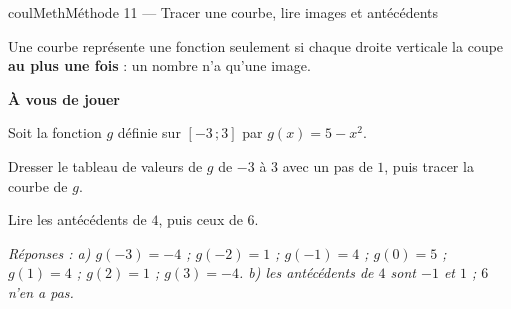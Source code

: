 \documentclass[11pt,a4paper]{article}
\makeatletter
\newcommand{\lycee@intff}[2]{\left[#1\,;#2\right]}
\providecommand{\intff}{\lycee@intff}%
\newcounter{lycee@signet}
\newcommand{\signet}[3][]{\stepcounter{lycee@signet}%
  \edef\lycee@dest{\if\relax\detokenize{#1}\relax
    signet.\arabic{lycee@signet}\else#1\fi}%
  \hypertarget{\lycee@dest}{}\bookmark[level=#2,dest=\lycee@dest]{#3}}
\newcounter{methode}
\newenvironment{methodebox}[1][Méthode]{\stepcounter{methode}%
  \begin{boitecours}[phantom={\signet[methode-\arabic{methode}]{2}{#1}}]{coulMeth}{#1}}%
  {\end{boitecours}}
\newcommand{\etape}[1]{\par\smallskip\textbf{\color{coulMeth}#1}\par\nobreak\smallskip}
\newcommand{\reponse}[1]{\par\smallskip
  {\footnotesize\itshape\color{black!55}Réponses : #1}}
\makeatother
\begin{document}
\begin{methodebox}[Méthode 11 --- Tracer une courbe, lire images et antécédents]
\begin{remarquebox}
Une courbe représente une fonction seulement si chaque droite verticale la coupe
\textbf{au plus une fois} : un nombre n'a qu'une image.
\end{remarquebox}

\etape{À vous de jouer}
Soit la fonction $g$ définie sur $\intff{-3}{3}$ par ${g(x)=5-x^{2}}$.
\begin{questions}[label=\alph*)]
  \item Dresser le tableau de valeurs de $g$ de $-3$ à $3$ avec un pas de $1$, puis
        tracer la courbe de $g$.
  \item Lire les antécédents de $4$, puis ceux de $6$.
\end{questions}
\reponse{a) $g(-3)=-4$ ;\; $g(-2)=1$ ;\; $g(-1)=4$ ;\; $g(0)=5$ ;\; $g(1)=4$ ;\;
$g(2)=1$ ;\; $g(3)=-4$.\; b) les antécédents de $4$ sont $-1$ et $1$ ;\; $6$ n'en a pas.}
\end{methodebox}
\end{document}
